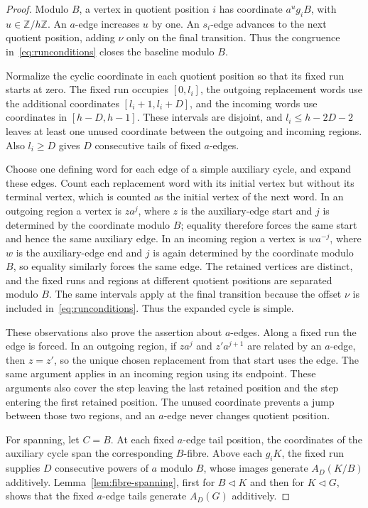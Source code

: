 \documentclass[11pt,a4paper,reqno]{amsart}
\theoremstyle{definition}
\theoremstyle{remark}
\numberwithin{equation}{section}
\newcommand{\Z}{\mathbb Z}
\begin{document}
\begin{proof}
Modulo $B$, a vertex in quotient position $i$ has coordinate $a^u g_iB$, with $u\in\Z/h\Z$. An $a$-edge increases $u$ by one. An $s_i$-edge advances to the next quotient position, adding $\nu$ only on the final transition. Thus the congruence in~\eqref{eq:runconditions} closes the baseline modulo $B$.

Normalize the cyclic coordinate in each quotient position so that its fixed run starts at zero. The fixed run occupies $[0,l_i]$, the outgoing replacement words use the additional coordinates $[l_i+1,l_i+D]$, and the incoming words use coordinates in $[h-D,h-1]$. These intervals are disjoint, and $l_i\le h-2D-2$ leaves at least one unused coordinate between the outgoing and incoming regions. Also $l_i\ge D$ gives $D$ consecutive tails of fixed $a$-edges.

Choose one defining word for each edge of a simple auxiliary cycle, and expand these edges. Count each replacement word with its initial vertex but without its terminal vertex, which is counted as the initial vertex of the next word. In an outgoing region a vertex is $za^j$, where $z$ is the auxiliary-edge start and $j$ is determined by the coordinate modulo $B$; equality therefore forces the same start and hence the same auxiliary edge. In an incoming region a vertex is $wa^{-j}$, where $w$ is the auxiliary-edge end and $j$ is again determined by the coordinate modulo $B$, so equality similarly forces the same edge. The retained vertices are distinct, and the fixed runs and regions at different quotient positions are separated modulo $B$. The same intervals apply at the final transition because the offset $\nu$ is included in~\eqref{eq:runconditions}. Thus the expanded cycle is simple.

These observations also prove the assertion about $a$-edges. Along a fixed run the edge is forced. In an outgoing region, if $za^j$ and $z'a^{j+1}$ are related by an $a$-edge, then $z=z'$, so the unique chosen replacement from that start uses the edge. The same argument applies in an incoming region using its endpoint. These arguments also cover the step leaving the last retained position and the step entering the first retained position. The unused coordinate prevents a jump between those two regions, and an $a$-edge never changes quotient position.

For spanning, let $C=B$. At each fixed $a$-edge tail position, the coordinates of the auxiliary cycle span the corresponding $B$-fibre. Above each $g_iK$, the fixed run supplies $D$ consecutive powers of $a$ modulo $B$, whose images generate $A_D(K/B)$ additively. Lemma~\ref{lem:fibre-spanning}, first for $B\lhd K$ and then for $K\lhd G$, shows that the fixed $a$-edge tails generate $A_D(G)$ additively.
\end{proof}
\end{document}
